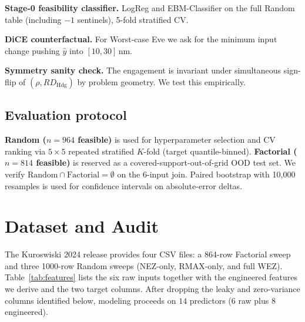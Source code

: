 \documentclass[conference]{IEEEtran}
\begin{document}
\textbf{Stage-0 feasibility classifier.} LogReg and EBM-Classifier on the full Random table (including $-1$ sentinels), 5-fold stratified CV.

\textbf{DiCE counterfactual.} For Worst-case Eve we ask for the minimum input change pushing $\hat{y}$ into $[10, 30]$\,nm.

\textbf{Symmetry sanity check.} The engagement is invariant under simultaneous sign-flip of $(\rho, RD_{\text{Hdg}})$ by problem geometry. We test this empirically.

\subsection{Evaluation protocol}
\textbf{Random ($n=964$ feasible)} is used for hyperparameter selection and CV ranking via $5\times 5$ repeated stratified $K$-fold (target quantile-binned). \textbf{Factorial ($n=814$ feasible)} is reserved as a covered-support-out-of-grid OOD test set. We verify $\text{Random} \cap \text{Factorial} = \emptyset$ on the 6-input join. Paired bootstrap with 10{,}000 resamples is used for confidence intervals on absolute-error deltas.

\section{Dataset and Audit}
\label{sec:dataset}
The Kuroswiski 2024 release provides four CSV files: a 864-row Factorial sweep and three 1000-row Random sweeps (NEZ-only, RMAX-only, and full WEZ). Table~\ref{tab:features} lists the six raw inputs together with the engineered features we derive and the two target columns. After dropping the leaky and zero-variance columns identified below, modeling proceeds on $14$ predictors (6 raw plus 8 engineered).
\end{document}
